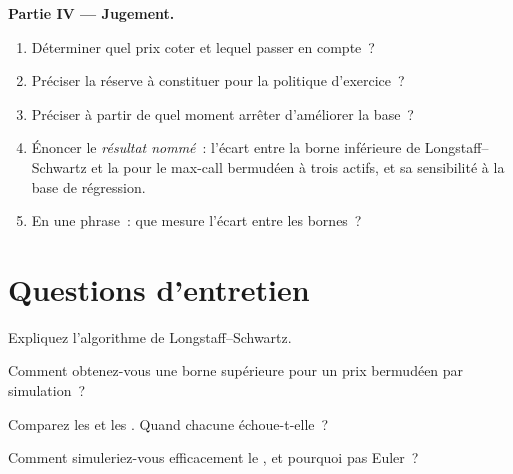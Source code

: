\begin{problem}
\medskip\noindent\textbf{Partie IV --- Jugement.}
\begin{enumerate}[resume]
\item Déterminer quel prix coter et lequel passer en compte~?
\item Préciser la réserve à constituer pour la politique d'exercice~?
\item Préciser à partir de quel moment arrêter d'améliorer la base~?
\item Énoncer le \emph{résultat nommé}~: l'écart entre la borne inférieure de Longstaff--Schwartz et la  pour le max-call bermudéen à trois actifs, et
sa sensibilité à la base de régression.
\item En une phrase~: que mesure l'écart entre les bornes~?
\end{enumerate}
\end{problem}

\section{Questions d'entretien}

\begin{interviewq}\label{iq:dv:monte-carlo-pricers-in-practice:1}
Expliquez l'algorithme de Longstaff--Schwartz.
\end{interviewq}

\begin{interviewq}\label{iq:dv:monte-carlo-pricers-in-practice:2}
Comment obtenez-vous une borne supérieure pour un prix bermudéen par simulation~?
\end{interviewq}

\begin{interviewq}\label{iq:dv:monte-carlo-pricers-in-practice:3}
Comparez les  et les . Quand chacune échoue-t-elle~?
\end{interviewq}

\begin{interviewq}\label{iq:dv:monte-carlo-pricers-in-practice:4}
Comment simuleriez-vous efficacement le , et pourquoi pas Euler~?
\end{interviewq}

